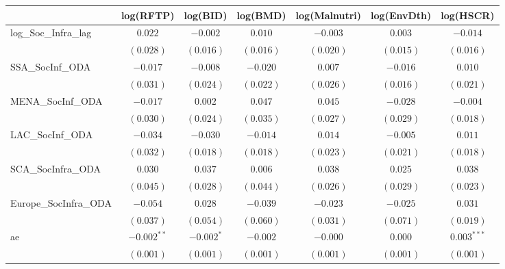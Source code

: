 \begin{table}
\begin{center}
\begin{tabular}{l c c c c c c}
\hline
 & log(RFTP) & log(BID) & log(BMD) & log(Malnutri) & log(EnvDth) & log(HSCR) \\
\hline
log\_Soc\_Infra\_lag  & $0.022$        & $-0.002$       & $0.010$       & $-0.003$       & $0.003$        & $-0.014$      \\
                      & $(0.028)$      & $(0.016)$      & $(0.016)$     & $(0.020)$      & $(0.015)$      & $(0.016)$     \\
SSA\_SocInf\_ODA      & $-0.017$       & $-0.008$       & $-0.020$      & $0.007$        & $-0.016$       & $0.010$       \\
                      & $(0.031)$      & $(0.024)$      & $(0.022)$     & $(0.026)$      & $(0.016)$      & $(0.021)$     \\
MENA\_SocInf\_ODA     & $-0.017$       & $0.002$        & $0.047$       & $0.045$        & $-0.028$       & $-0.004$      \\
                      & $(0.030)$      & $(0.024)$      & $(0.035)$     & $(0.027)$      & $(0.029)$      & $(0.018)$     \\
LAC\_SocInf\_ODA      & $-0.034$       & $-0.030$       & $-0.014$      & $0.014$        & $-0.005$       & $0.011$       \\
                      & $(0.032)$      & $(0.018)$      & $(0.018)$     & $(0.023)$      & $(0.021)$      & $(0.018)$     \\
SCA\_SocInfra\_ODA    & $0.030$        & $0.037$        & $0.006$       & $0.038$        & $0.025$        & $0.038$       \\
                      & $(0.045)$      & $(0.028)$      & $(0.044)$     & $(0.026)$      & $(0.029)$      & $(0.023)$     \\
Europe\_SocInfra\_ODA & $-0.054$       & $0.028$        & $-0.039$      & $-0.023$       & $-0.025$       & $0.031$       \\
                      & $(0.037)$      & $(0.054)$      & $(0.060)$     & $(0.031)$      & $(0.071)$      & $(0.019)$     \\
ae                    & $-0.002^{**}$  & $-0.002^{*}$   & $-0.002$      & $-0.000$       & $0.000$        & $0.003^{***}$ \\
                      & $(0.001)$      & $(0.001)$      & $(0.001)$     & $(0.001)$      & $(0.001)$      & $(0.001)$     \\

\end{tabular}
\end{center}
\end{table}
